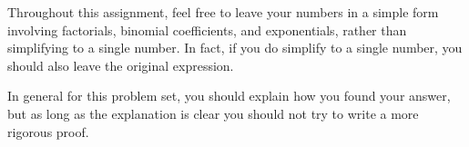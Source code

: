 \documentclass[11pt,fleqn]{article}
\def\title{HW \the\lecturenumber, Manohar Jois}
\begin{document}
\iffalse
\usepackage{sectsty}
\allsectionsfont{\sffamily\mdseries\upshape} %

\usepackage[nottoc,notlof,notlot]{tocbibind} %
\usepackage[titles,subfigure]{tocloft} %
\renewcommand{\cftsecfont}{\rmfamily\mdseries\upshape}
\renewcommand{\cftsecpagefont}{\rmfamily\mdseries\upshape} %


\newcommand{\N}{\mathbb{N}}
\newcommand{\Z}{\mathbb{Z}}
\newcommand{\R}{\mathbb{R}}
\newcommand{\Q}{\mathbb{Q}}
\fi
\newcommand{\p}[1]{\left(#1\right)}
\renewcommand{\gcd}[1]{\text{gcd}\p{#1}}
\renewcommand{\deg}[1]{\text{deg}\p{#1}}




Throughout this assignment, feel free to leave your numbers
in a simple form involving factorials,
binomial coefficients, and exponentials,
rather than simplifying to a single number.
In fact, if you do simplify to a single number,
you should also leave the original expression.

In general for this problem set, you should explain how you
found your answer, but as long as the explanation
is clear you should not try to write a more rigorous proof.
\end{document}
